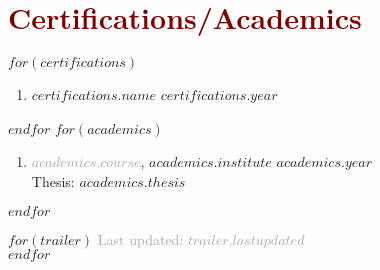 \documentclass[$fontsize$, a4paper]{article}
\begin{document}
\section*{\textcolor{Maroon}{Certifications/Academics}}
$for(certifications)$
  \begin{enumerate}
    [topsep=0pt,itemsep=0pt,parsep=0pt,partopsep=0pt,leftmargin=10pt,label=•]
    \item{\href{$certifications.url$}{$certifications.name$} \hfill $certifications.year$}
  \end{enumerate}
$endfor$
\vspace{0.3cm}
$for(academics)$
  \begin{enumerate}
    [topsep=0pt,itemsep=0pt,parsep=0pt,partopsep=0pt,leftmargin=10pt,label=•]
    \item{\textcolor{darkgray}{\textbf{$academics.course$}}, \textbf{\href{$academics.url$}{$academics.institute$}} \hfill $academics.year$\\Thesis: \href{$academics.thesis_url$}{$academics.thesis$}}
  \end{enumerate}
$endfor$

\vspace*{\fill}
$for(trailer)$
  \footnotesize{\textcolor{darkgray}{Last updated: $trailer.lastupdated$}}\\
$endfor$
\end{document}
